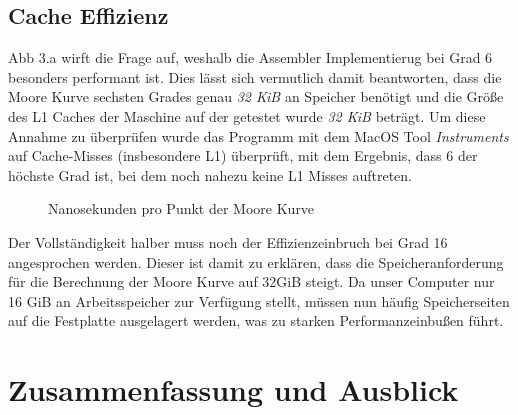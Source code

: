 \documentclass[course=erap]{aspdoc}
\begin{document}
\subsection{Cache Effizienz}
Abb 3.a wirft die Frage auf, weshalb die Assembler Implementierug bei Grad 6 besonders performant ist. Dies lässt sich vermutlich damit beantworten, dass die Moore Kurve sechsten Grades genau \textit{32 KiB} an Speicher benötigt und die Größe des L1 Caches der Maschine auf der getestet wurde \textit{32 KiB} beträgt. Um diese Annahme zu überprüfen wurde das Programm mit dem MacOS Tool \textit{Instruments} auf Cache-Misses (insbesondere L1) überprüft, mit dem Ergebnis, dass 6 der höchste Grad ist, bei dem noch nahezu keine L1 Misses auftreten.

\begin{figure}[htbp] 
    \centering
    \qquad
    \caption{Nanosekunden pro Punkt der Moore Kurve}%
    \label{fig:Laufzeitvergleich Skaliert}%
 \end{figure}
 
 Der Vollständigkeit halber muss noch der Effizienzeinbruch bei Grad 16 angesprochen werden. Dieser ist damit zu erklären, dass die Speicheranforderung für die Berechnung der Moore Kurve auf 32GiB steigt. Da unser Computer nur 16 GiB an Arbeitsspeicher zur Verfügung stellt, müssen nun häufig Speicherseiten auf die Festplatte ausgelagert werden, was zu starken Performanzeinbußen führt.



\section{Zusammenfassung und Ausblick}


{}
\end{document}
